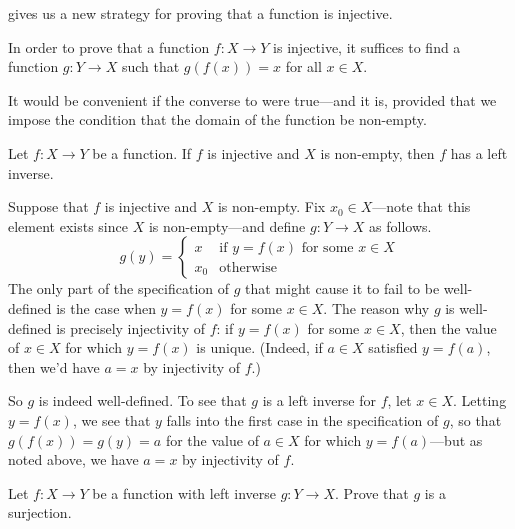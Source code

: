  gives us a new strategy for proving that a function is injective.

\begin{strategy}
In order to prove that a function $f : X \to Y$ is injective, it suffices to find a function $g : Y \to X$ such that $g(f(x)) = x$ for all $x \in X$.
\end{strategy}

It would be convenient if the converse to  were true---and it is, provided that we impose the condition that the domain of the function be non-empty.

\begin{proposition}
\label{propIfInjectiveThenHasLeftInverse}
Let $f : X \to Y$ be a function. If $f$ is injective and $X$ is non-empty, then $f$ has a left inverse.
\end{proposition}

\begin{cproof}
Suppose that $f$ is injective and $X$ is non-empty. Fix $x_0 \in X$---note that this element exists since $X$ is non-empty---and define $g : Y \to X$ as follows.
\[ g(y) = \begin{cases} x & \text{if } y=f(x) \text{ for some } x \in X \\ x_0 & \text{otherwise} \end{cases} \]
The only part of the specification of $g$ that might cause it to fail to be well-defined is the case when $y=f(x)$ for some $x \in X$. The reason why $g$ is well-defined is precisely injectivity of $f$: if $y=f(x)$ for some $x \in X$, then the value of $x \in X$ for which $y = f(x)$ is unique. (Indeed, if $a \in X$ satisfied $y=f(a)$, then we'd have $a=x$ by injectivity of $f$.)

So $g$ is indeed well-defined. To see that $g$ is a left inverse for $f$, let $x \in X$. Letting $y = f(x)$, we see that $y$ falls into the first case in the specification of $g$, so that $g(f(x)) = g(y) = a$ for the value of $a \in X$ for which $y = f(a)$---but as noted above, we have $a=x$ by injectivity of $f$.
\end{cproof}

\begin{exercise}
Let $f : X \to Y$ be a function with left inverse $g : Y \to X$. Prove that $g$ is a surjection.
\end{exercise}


